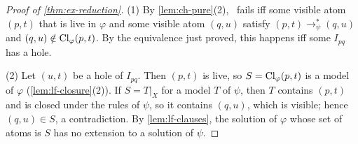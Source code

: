 \begin{proof}[Proof of \cref{thm:ex-reduction}]
(1) By \cref{lem:ch-pure}(2), \CondII\ fails iff some visible atom $(p,t)$
that is live in $\varphi$ and some visible atom $(q,u)$ satisfy
$(p,t)\to^*_\psi(q,u)$ and $(q,u)\notin\operatorname{Cl}_\varphi(p,t)$. By the equivalence
just proved, this happens iff some $I_{pq}$ has a hole.

(2) Let $(u,t)$ be a hole of $I_{pq}$. Then $(p,t)$ is live, so
$S=\operatorname{Cl}_\varphi(p,t)$ is a model of $\varphi$ (\cref{lem:lf-closure}(2)). If
$S=T|_X$ for a model $T$ of $\psi$, then $T$ contains $(p,t)$ and is closed
under the rules of $\psi$, so it contains $(q,u)$, which is visible; hence
$(q,u)\in S$, a contradiction. By \cref{lem:lf-clauses}, the solution of
$\varphi$ whose set of atoms is $S$ has no extension to a solution of $\psi$.
\end{proof}
